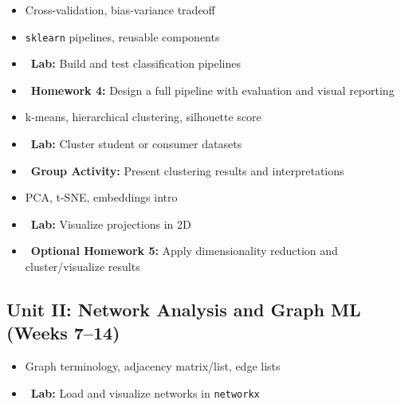 \documentclass[11pt,a4paper]{article}
\begin{document}
\begin{weekbox}[title={Week 4: Model Evaluation \& Pipelines}]
\begin{itemize}
  \item Cross-validation, bias-variance tradeoff
  \item \texttt{sklearn} pipelines, reusable components
  \item \textcolor{accent}{\faFlask\ \textbf{Lab:}} Build and test classification pipelines
  \item \textcolor{warning}{\faEdit\ \textbf{Homework 4:}} Design a full pipeline with evaluation and visual reporting
\end{itemize}
\end{weekbox}

\begin{weekbox}[title={Week 5: Clustering \& Unsupervised Learning}]
\begin{itemize}
  \item k-means, hierarchical clustering, silhouette score
  \item \textcolor{accent}{\faFlask\ \textbf{Lab:}} Cluster student or consumer datasets
  \item \textcolor{success}{\faUsers\ \textbf{Group Activity:}} Present clustering results and interpretations
\end{itemize}
\end{weekbox}

\begin{weekbox}[title={Week 6: Dimensionality Reduction}]
\begin{itemize}
  \item PCA, t-SNE, embeddings intro
  \item \textcolor{accent}{\faFlask\ \textbf{Lab:}} Visualize projections in 2D
  \item \textcolor{secondary}{\faQuestion\ \textbf{Optional Homework 5:}} Apply dimensionality reduction and cluster/visualize results
\end{itemize}
\end{weekbox}

\subsection*{\textcolor{secondary}{\faNetworkWired} Unit II: Network Analysis and Graph ML (Weeks 7--14)}

\begin{weekbox}[title={Week 7: Introduction to Graphs}]
\begin{itemize}
  \item Graph terminology, adjacency matrix/list, edge lists
  \item \textcolor{accent}{\faFlask\ \textbf{Lab:}} Load and visualize networks in \texttt{networkx}
\end{itemize}
\end{weekbox}
\end{document}
